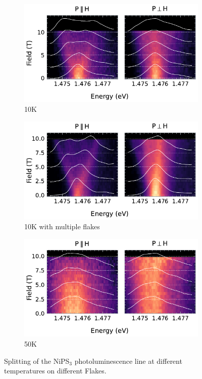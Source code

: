 \documentclass[
	oneside,
	parskip=half,
	a4paper,
]{scrbook}
\begin{document}
\begin{figure}
	\centering
	\begin{subfigure}{4in}
		\includegraphics{../figures/2024-04-18 NiPS4 splitting 10K.pdf}
		\caption{10K}
		\label{fig:NiPS3 10K}
	\end{subfigure}
	\begin{subfigure}{4in}
		\includegraphics{../figures/2024-04-18 NiPS4 splitting 10K multiple flakes.pdf}
		\caption{10K with multiple flakes}
		\label{fig:NiPS3 10K multiple flakes}
	\end{subfigure}
	\begin{subfigure}{4in}
		\includegraphics{../figures/2024-04-18 NiPS4 splitting 50K.pdf}
		\caption{50K}
	\end{subfigure}
	\caption{Splitting of the NiPS$_3$ photoluminescence line at different temperatures on different Flakes.}
	\label{fig:NiPS3 multiple temperatures}
\end{figure}
\end{document}
